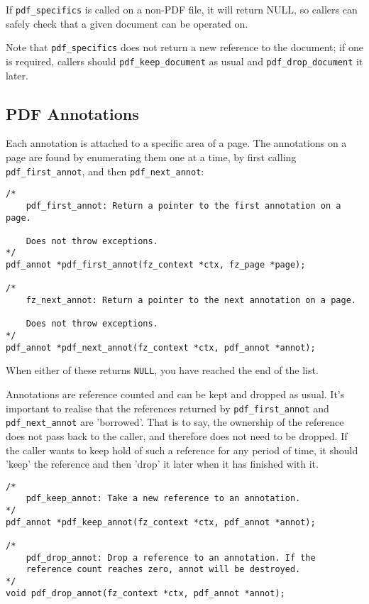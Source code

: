 \documentclass[oneside]{book}
\begin{document}
If \texttt{pdf\_specifics} is called on a non-PDF file, it will return NULL, so callers can safely check that a given document can be operated on.

Note that \texttt{pdf\_specifics} does not return a new reference to the document; if one is required, callers should \texttt{pdf\_keep\_document} as usual and \texttt{pdf\_drop\_document} it later.

\subsection{PDF Annotations}

Each annotation is attached to a specific area of a page. The annotations on a page are found by enumerating them one at a time, by first calling \texttt{pdf\_first\_annot}, and then \texttt{pdf\_next\_annot}:

\begin{lstlisting}
/*
	pdf_first_annot: Return a pointer to the first annotation on a page.

	Does not throw exceptions.
*/
pdf_annot *pdf_first_annot(fz_context *ctx, fz_page *page);

/*
	fz_next_annot: Return a pointer to the next annotation on a page.

	Does not throw exceptions.
*/
pdf_annot *pdf_next_annot(fz_context *ctx, pdf_annot *annot);
\end{lstlisting}

When either of these returns \texttt{NULL}, you have reached the end of the list.

Annotations are reference counted and can be kept and dropped as usual. It's important to realise that the references returned by \texttt{pdf\_first\_annot}
and \texttt{pdf\_next\_annot} are 'borrowed'. That is to say, the ownership of the reference does not pass back to the caller, and therefore does not need to be dropped. If the caller wants to keep hold of such a reference for any period of time, it should 'keep' the reference and then 'drop' it later when it has finished with it.

\begin{lstlisting}
/*
	pdf_keep_annot: Take a new reference to an annotation.
*/
pdf_annot *pdf_keep_annot(fz_context *ctx, pdf_annot *annot);

/*
	pdf_drop_annot: Drop a reference to an annotation. If the
	reference count reaches zero, annot will be destroyed.
*/
void pdf_drop_annot(fz_context *ctx, pdf_annot *annot);
\end{lstlisting}
\end{document}
